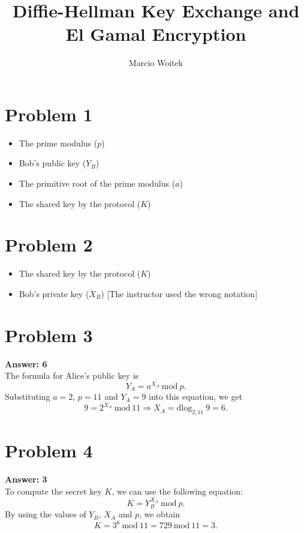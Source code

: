\documentclass[11pt]{article}
\author{Marcio Woitek}
\date{}
\title{Diffie-Hellman Key Exchange and El Gamal Encryption}
\newcommand{\Mod}{\:\mathrm{mod}\:}
\newcommand{\dlog}[3]{\mathrm{dlog}_{#2,#3}\:#1}
\begin{document}
\maketitle
\thispagestyle{empty}
\pagestyle{empty}
\section*{Problem 1}
\label{sec:orgb43a426}
\begin{itemize}
\item The prime modulus (\(p\))
\item Bob's public key (\(Y_B\))
\item The primitive root of the prime modulus (\(a\))
\item The shared key by the protocol (\(K\))
\end{itemize}
\section*{Problem 2}
\label{sec:orgdf92db4}
\begin{itemize}
\item The shared key by the protocol (\(K\))
\item Bob's private key (\(X_B\)) [The instructor used the wrong notation]
\end{itemize}
\section*{Problem 3}
\label{sec:org331cdca}
\textbf{Answer: 6}\\

The formula for Alice's public key is
\begin{equation}
Y_A=a^{X_A}\Mod p.
\end{equation}
Substituting \(a=2\), \(p=11\) and \(Y_A=9\) into this equation, we get
\begin{equation}
9=2^{X_A}\Mod 11\Rightarrow X_A=\dlog{9}{2}{11}=6.
\end{equation}
\section*{Problem 4}
\label{sec:orgf5e7333}
\textbf{Answer: 3}\\

To compute the secret key \(K\), we can use the following equation:
\begin{equation}
K=Y_{B}^{X_A}\Mod p.
\end{equation}
By using the values of \(Y_B\), \(X_A\) and \(p\), we obtain
\begin{equation}
K=3^6\Mod 11=729\Mod 11=3.
\end{equation}
\end{document}
